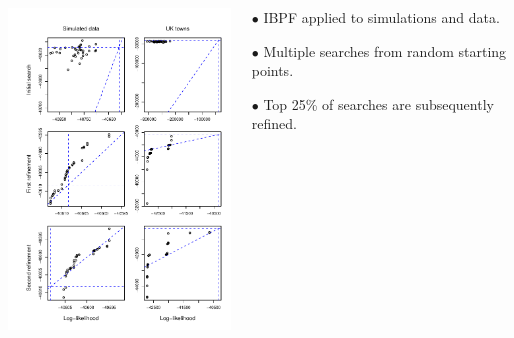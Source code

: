 \documentclass{beamer}
\begin{document}
\begin{frame}

\vspace{-6mm}

\begin{columns}[T] %
\begin{column}{.75\textwidth}
  \includegraphics[width=6.8cm]{ibpf/search_diagnostics-1.pdf}
\end{column}

\hspace{-15mm}
\begin{column}{.35\textwidth}
  \vspace{10mm}
  
$\bullet$    IBPF applied to simulations and data.

    \vspace{5mm}

$\bullet$    Multiple searches from random starting points.

    \vspace{5mm}
    
$\bullet$    Top 25\% of searches are subsequently refined.
    
  \end{column}
\end{columns}

\end{frame}
\end{document}
